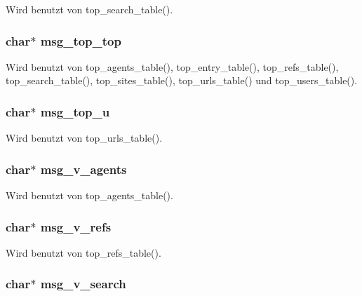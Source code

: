 Wird benutzt von top\_\-search\_\-table().
\subsubsection{\setlength{\rightskip}{0pt plus 5cm}char$\ast$ {\bf msg\_\-top\_\-top}}\label{lang_8h_ccd25ad9dd7b9fb588071f55d6a3c98c}




Wird benutzt von top\_\-agents\_\-table(), top\_\-entry\_\-table(), top\_\-refs\_\-table(), top\_\-search\_\-table(), top\_\-sites\_\-table(), top\_\-urls\_\-table() und top\_\-users\_\-table().
\subsubsection{\setlength{\rightskip}{0pt plus 5cm}char$\ast$ {\bf msg\_\-top\_\-u}}\label{lang_8h_7231f924432df2c0d2e056d15b7919ad}




Wird benutzt von top\_\-urls\_\-table().
\subsubsection{\setlength{\rightskip}{0pt plus 5cm}char$\ast$ {\bf msg\_\-v\_\-agents}}\label{lang_8h_e4c3f02df2f45e19ffab7bd99d0169d2}




Wird benutzt von top\_\-agents\_\-table().
\subsubsection{\setlength{\rightskip}{0pt plus 5cm}char$\ast$ {\bf msg\_\-v\_\-refs}}\label{lang_8h_26ccd1f09cf35a65c0ad152c9d44be8a}




Wird benutzt von top\_\-refs\_\-table().
\subsubsection{\setlength{\rightskip}{0pt plus 5cm}char$\ast$ {\bf msg\_\-v\_\-search}}\label{lang_8h_0565fe1151bc9dd5de181b2d1de42350}




